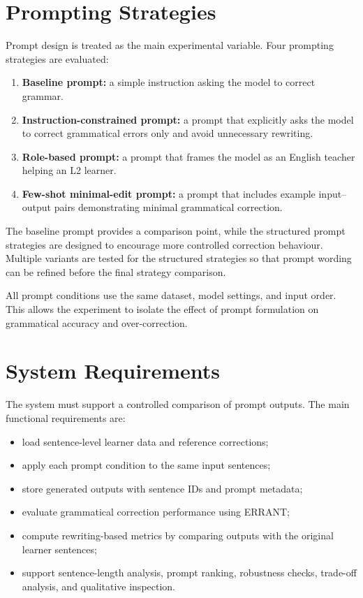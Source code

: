 \section{Prompting Strategies}

Prompt design is treated as the main experimental variable. Four prompting strategies are evaluated:

\begin{enumerate}
    \item \textbf{Baseline prompt:} a simple instruction asking the model to correct grammar.
    \item \textbf{Instruction-constrained prompt:} a prompt that explicitly asks the model to correct grammatical errors only and avoid unnecessary rewriting.
    \item \textbf{Role-based prompt:} a prompt that frames the model as an English teacher helping an L2 learner.
    \item \textbf{Few-shot minimal-edit prompt:} a prompt that includes example input--output pairs demonstrating minimal grammatical correction.
\end{enumerate}

The baseline prompt provides a comparison point, while the structured prompt strategies are designed to encourage more controlled correction behaviour. Multiple variants are tested for the structured strategies so that prompt wording can be refined before the final strategy comparison.

All prompt conditions use the same dataset, model settings, and input order. This allows the experiment to isolate the effect of prompt formulation on grammatical accuracy and over-correction.

\section{System Requirements}

The system must support a controlled comparison of prompt outputs. The main functional requirements are:

\begin{itemize}
    \item load sentence-level learner data and reference corrections;
    \item apply each prompt condition to the same input sentences;
    \item store generated outputs with sentence IDs and prompt metadata;
    \item evaluate grammatical correction performance using ERRANT;
    \item compute rewriting-based metrics by comparing outputs with the original learner sentences;
    \item support sentence-length analysis, prompt ranking, robustness checks, trade-off analysis, and qualitative inspection.
\end{itemize}

